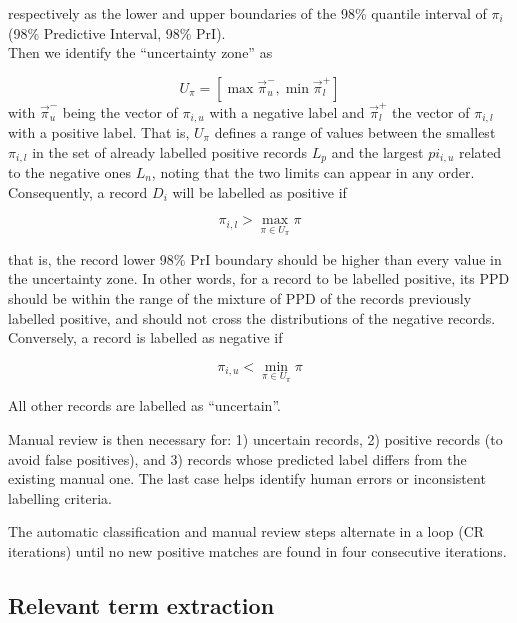 \documentclass{article}
\begin{document}
respectively as the lower and upper boundaries of the 98\% quantile
interval of \(\pi_i\) (98\% Predictive Interval, 98\% PrI).\\
Then we identify the ``uncertainty zone'' as

\[U_\pi=[\max\vec{\pi}_{u}^-, \min\vec{\pi}_{l}^+]\] with
\(\vec{\pi}_{u}^-\) being the vector of \(\pi_{i,u}\) with a negative
label and \(\vec{\pi}_{l}^+\) the vector of \(\pi_{i,l}\) with a
positive label. That is, \(U_\pi\) defines a range of values between the
smallest \(\pi_{i,l}\) in the set of already labelled positive records
\(L_p\) and the largest \(pi_{i,u}\) related to the negative ones
\(L_n\), noting that the two limits can appear in any order.\\
Consequently, a record \(D_i\) will be labelled as positive if

\[\pi_{i,l} > \max_{\pi \in U_\pi} \pi\]

that is, the record lower 98\% PrI boundary should be higher than every
value in the uncertainty zone. In other words, for a record to be
labelled positive, its PPD should be within the range of the mixture of
PPD of the records previously labelled positive, and should not cross
the distributions of the negative records.\\
Conversely, a record is labelled as negative if

\[\pi_{i,u} < \min_{\pi \in U_\pi} \pi\]

All other records are labelled as ``uncertain''.

Manual review is then necessary for: 1) uncertain records, 2) positive
records (to avoid false positives), and 3) records whose predicted label
differs from the existing manual one. The last case helps identify human
errors or inconsistent labelling criteria.

The automatic classification and manual review steps alternate in a loop
(CR iterations) until no new positive matches are found in four
consecutive iterations.

\hypertarget{relevant-term-extraction}{%
\subsection{Relevant term extraction}\label{relevant-term-extraction}}
\end{document}
